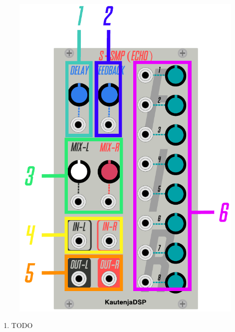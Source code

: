 \documentclass[12pt,letter]{article}
\begin{document}
\begin{figure}[!htp]
\centering
\includegraphics{S-SMP-Echo-Manual}
\end{figure}

\clearpage
\begin{enumerate}
  \item TODO
\end{enumerate}


\clearpage
\renewcommand\refname{References \& Acknowledgments}
\nocite{*}


\end{document}
